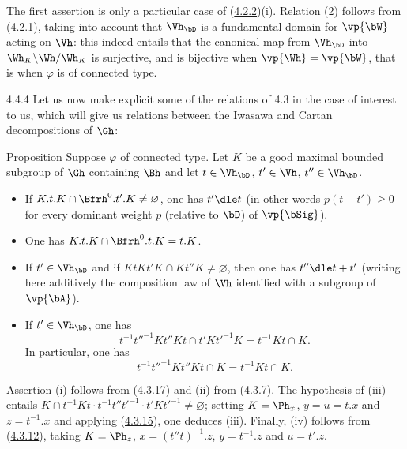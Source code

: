 \documentclass[12pt,a4paper,oneside,english]{smfart}
\makeatletter
\newcommand{\btanchor}[1]{\leavevmode\Hy@raisedlink{\hypertarget{bt:#1}{}}}
\newcommand{\btref}[1]{\hyperlink{bt:#1}{#1}}
\theoremstyle{definition}
\theoremstyle{bt}
\makeatother
\begin{document}
The first assertion is only a particular case of (\btref{4.2.2})(i). Relation (2)
follows from (\btref{4.2.1}), taking into account that $\Vh_{\bD}$ is a fundamental
domain for $\vp{\bW}$ acting on $\Vh$: this indeed entails that the canonical
map from $\Vh_{\bD}$ into $\Wh_{K}\backslash\Wh/\Wh_{K}$ is surjective, and
is bijective when $\vp{\Wh} = \vp{\bW}$, that is when $\varphi$ is of
connected type.

\num{4.4.4}\btanchor{4.4.4}
Let us now make explicit some of the relations of 4.3 in the case of interest
to us, which will give us relations between the Iwasawa and Cartan
decompositions of $\Gh$:

\begin{states}{Proposition}
Suppose $\varphi$ of connected type. Let $K$ be a good maximal bounded
subgroup of $\Gh$ containing $\Bh$ and let $t\in\Vh_{\bD}$, $t'\in\Vh$,
$t''\in\Vh_{\bD}$.
\begin{itemize}
\item[(i)] If $K.t.K\cap\Bfrh^{0}.t'.K \neq\varnothing$, one has
$t' \dle t$ (in other words $p(t-t')\geqslant 0$ for every dominant weight
$p$ (relative to $\bD$) of $\vp{\bSig}$).
\item[(ii)] One has $K.t.K\cap\Bfrh^{0}.t.K = t.K$.
\item[(iii)] If $t'\in\Vh_{\bD}$ and if $KtKt'K\cap Kt''K\neq\varnothing$,
then one has $t'' \dle t+t'$ (writing here additively the composition law of
$\Vh$ identified with a subgroup of $\vp{\bA}$).
\item[(iv)] If $t'\in\Vh_{\bD}$, one has
\[
t^{-1}t''^{-1}Kt''Kt\cap t'Kt'^{-1}K = t^{-1}Kt\cap K .
\]
In particular, one has
\[
t^{-1}t''^{-1}Kt''Kt\cap K = t^{-1}Kt\cap K .
\]
\end{itemize}
\end{states}

Assertion (i) follows from (\btref{4.3.17}) and (ii) from (\btref{4.3.7}). The hypothesis of
(iii) entails
$K\cap t^{-1}Kt\cdot t^{-1}t''t'^{-1}\cdot t'Kt'^{-1}\neq\varnothing$;
setting $K = \Ph_{x}$, $y = u = t.x$ and $z = t^{-1}.x$ and applying
(\btref{4.3.15}), one deduces (iii). Finally, (iv) follows from (\btref{4.3.12}), taking
$K = \Ph_{z}$, $x = (t''t)^{-1}.z$, $y = t^{-1}.z$ and $u = t'.z$.
\end{document}
